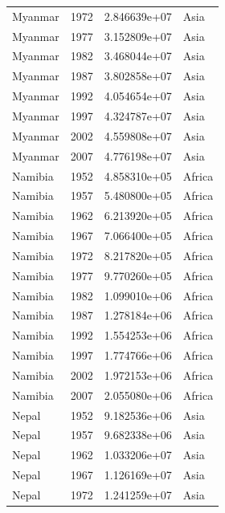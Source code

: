\documentclass[
  letterpaper,
  DIV=11,
  numbers=noendperiod]{scrreprt}
\begin{document}
\begin{tcolorbox}
\begin{tabular}{lrrl}
Myanmar                  &  1972 &  2.846639e+07 &      Asia \\
Myanmar                  &  1977 &  3.152809e+07 &      Asia \\
Myanmar                  &  1982 &  3.468044e+07 &      Asia \\
Myanmar                  &  1987 &  3.802858e+07 &      Asia \\
Myanmar                  &  1992 &  4.054654e+07 &      Asia \\
Myanmar                  &  1997 &  4.324787e+07 &      Asia \\
Myanmar                  &  2002 &  4.559808e+07 &      Asia \\
Myanmar                  &  2007 &  4.776198e+07 &      Asia \\
Namibia                  &  1952 &  4.858310e+05 &    Africa \\
Namibia                  &  1957 &  5.480800e+05 &    Africa \\
Namibia                  &  1962 &  6.213920e+05 &    Africa \\
Namibia                  &  1967 &  7.066400e+05 &    Africa \\
Namibia                  &  1972 &  8.217820e+05 &    Africa \\
Namibia                  &  1977 &  9.770260e+05 &    Africa \\
Namibia                  &  1982 &  1.099010e+06 &    Africa \\
Namibia                  &  1987 &  1.278184e+06 &    Africa \\
Namibia                  &  1992 &  1.554253e+06 &    Africa \\
Namibia                  &  1997 &  1.774766e+06 &    Africa \\
Namibia                  &  2002 &  1.972153e+06 &    Africa \\
Namibia                  &  2007 &  2.055080e+06 &    Africa \\
Nepal                    &  1952 &  9.182536e+06 &      Asia \\
Nepal                    &  1957 &  9.682338e+06 &      Asia \\
Nepal                    &  1962 &  1.033206e+07 &      Asia \\
Nepal                    &  1967 &  1.126169e+07 &      Asia \\
Nepal                    &  1972 &  1.241259e+07 &      Asia \\

\end{tabular}
\end{tcolorbox}
\end{document}
